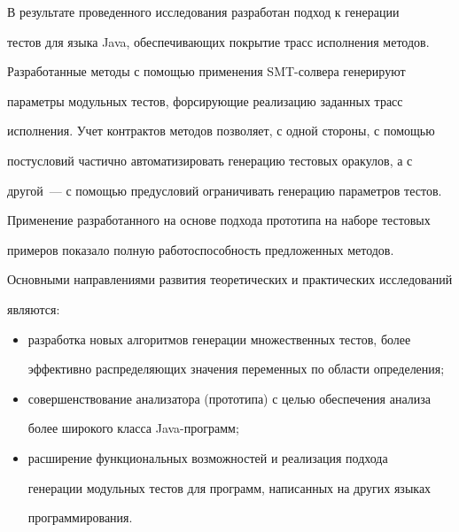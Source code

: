      В результате проведенного исследования разработан подход к генерации


тес\-тов для языка Java, обеспечивающих покрытие трасс исполнения методов.


Разработанные методы с помощью применения SMT-сол\-ве\-ра генерируют


параметры модульных тестов, форсирующие реализацию заданных трасс


исполнения. Учет контрактов методов позволяет, с одной стороны, с помощью


постусловий час\-тич\-но автоматизировать генерацию тестовых оракулов, а с


другой~--- с по\-мощью предусловий ограничивать генерацию параметров тестов.


Применение разработанного на основе подхода прототипа на наборе тестовых


примеров показало полную работоспособность предложенных методов.


Основными направлениями развития теоретических и практических исследований


являются:


     \begin{itemize}


\item разработка новых алгоритмов генерации множественных тестов, более


эффективно распределяющих значения переменных по области определения;


\item совершенствование анализатора (прототипа) с целью обеспечения анализа


более широкого класса Java-про\-грамм;


\item расширение функциональных возможностей и реализация подхода


генерации модульных тестов для программ, написанных на других языках


программирования.


\end{itemize}











